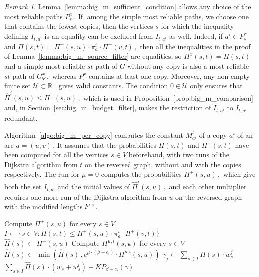 \documentclass[11pt,a4paper]{report}
\theoremstyle{definition}
\theoremstyle{remark}
\newtheorem*{remark}{Remark}
\begin{document}
\begin{remark}
  Lemma~\ref{lemma:big_m_sufficient_condition} allows any choice of the most reliable paths $P^x_s\,.$ If, among the simple most reliable paths, we choose one that contains the fewest copies, then the vertices $s$ for which the inequality defining $I_{t,a^i}$ is an equality can be excluded from $I_{t,a^i}$ as well. Indeed, if $a^i \in P^x_s$ and $\Pi(s,t) = \Pi^+(s,u) \cdot \pi^i_a \cdot \Pi^+(v,t)\,,$ then all the inequalities in the proof of Lemma~\ref{lemma:big_m_source_filter} are equalities, so $\Pi^x(s,t) = \Pi(s,t)$ and a simple most reliable $st$-path of $G$ without any copy is also a most reliable $st$-path of $G^x_\Psi\,,$ whereas $P^x_s$ contains at least one copy. Moreover, any non-empty finite set $\mathcal{U} \subset \mathbb{R}^+$ gives valid constants. The condition $0 \in \mathcal{U}$ only ensures that $\widehat{\Pi}^i(s,u) \leq \Pi^+(s,u)\,,$ which is used in Proposition~\ref{prop:big_m_comparison} and, in Section~\ref{sec:big_m_budget_filter}, makes the restriction of $\tilde{I}_{t,a^i}$ to $I_{t,a^i}$ redundant.
\end{remark}

Algorithm~\ref{algo:big_m_per_copy} computes the constant $M^t_{a^i}$ of a copy $a^i$ of an arc $a=(u,v)\,.$ It assumes that the probabilities $\Pi(s,t)$ and $\Pi^+(s,t)$ have been computed for all the vertices $s \in V$ beforehand, with two runs of the Dijkstra algorithm from $t$ on the reversed graph, without and with the copies respectively. The run for $\mu = 0$ computes the probabilities $\Pi^+(s,u)\,,$ which give both the set $I_{t,a^i}$ and the initial values of $\widehat{\Pi}^i(s,u)\,,$ and each other multiplier requires one more run of the Dijkstra algorithm from $u$ on the reversed graph with the modified lengths $l^{\mu,i}\,.$

\medskip
\begin{algorithm}[H]
  \caption{Computes the constant $M^t_{a^i}$ of a copy $a^i$\label{algo:big_m_per_copy}}
  Compute $\Pi^+(s,u)$ for every $s \in V$\\
  $I \gets \{s \in V : \Pi(s,t) \leq \Pi^+(s,u) \cdot \pi^i_a \cdot \Pi^+(v,t)\}$\\
   {
    $\widehat{\Pi}(s) \gets \Pi^+(s,u)$
  }
   {
    Compute $\Pi^{\mu,i}(s,u)$ for every $s \in V$\\
     {
      $\widehat{\Pi}(s) \gets \min\left(\widehat{\Pi}(s)\,, e^{\mu \cdot (\beta - c_i)} \cdot \Pi^{\mu,i}(s,u)\right)$
    }
  }
   {
    $\gamma_j \gets \sum_{s \in I} \widehat{\Pi}(s) \cdot w^j_s$
  }
  \Return $\sum_{s \in I} \widehat{\Pi}(s) \cdot \left(w_s + w^i_s\right) + KP_{\beta - c_i}(\gamma)$
\end{algorithm}
\end{document}
